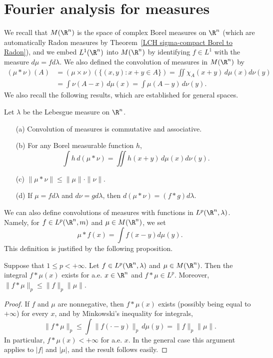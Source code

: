\section{Fourier analysis for measures}
We recall that $M(\R^n)$ is the space of complex Borel measures on $\R^n$ (which are automatically Radon measures by Theorem~\ref{LCH sigma-compact Borel to Radon}), and we embed $L^1(\R^n)$ into $M(\R^n)$ by identifying $f\in L^1$ with the measure $d\mu=fd\lambda$. We also defined the convolution of measures in $M(\R^n)$ by
\begin{align*}
(\mu\ast\nu)(A)&=(\mu\times\nu)(\{(x,y):x+y\in A\})=\iint\chi_A(x+y)\,d\mu(x)d\nu(y)\\
&=\int\nu(A-x)\,d\mu(x)=\int\mu(A-y)\,d\nu(y).
\end{align*}
We also recall the following results, which are established for general spaces.
\begin{proposition}\label{convolution measure R^n prop}
Let $\lambda$ be the Lebesgue measure on $\R^n$.
\begin{itemize}
\item[(a)] Convolution of measures is commutative and associative.
\item[(b)] For any Borel measurable function $h$,
\[\int h\,d(\mu\ast\nu)=\iint h(x+y)\,d\mu(x)d\nu(y).\]
\item[(c)] $\|\mu\ast\nu\|\leq\|\mu\|\cdot\|\nu\|$.
\item[(d)] If $\mu=fd\lambda$ and $d\nu=gd\lambda$, then $d(\mu\ast\nu)=(f\ast g)d\lambda$. 
\end{itemize}
\end{proposition}
We can also define convolutions of measures with functions in $L^p(\R^n,\lambda)$. Namely, for $f\in L^p(\R^n,m)$ and $\mu\in M(\R^n)$, we set
\[\mu\ast f(x)=\int f(x-y)d\mu(y).\]
This definition is justified by the following proposition.
\begin{proposition}
Suppose that $1\leq p<+\infty$. Let $f\in L^p(\R^n,\lambda)$ and $\mu\in M(\R^n)$. Then the integral $f\ast\mu(x)$ exists for a.e. $x\in\R^n$ and $f\ast\mu\in L^p$. Moreover, $\|f\ast\mu\|_p\leq\|f\|_p\|\mu\|$.
\end{proposition}
\begin{proof}
If $f$ and $\mu$ are nonnegative, then $f\ast\mu(x)$ exists (possibly being equal to $+\infty$) for every $x$, and by Minkowski's inequality for integrals,
\[\|f\ast\mu\|_p\leq\int\|f(\cdot-y)\|_p\,d\mu(y)=\|f\|_p\|\mu\|.\]
In particular, $f\ast\mu(x)<+\infty$ for a.e. $x$. In the general case this argument applies to $|f|$ and $|\mu|$, and the result follows easily.
\end{proof}
